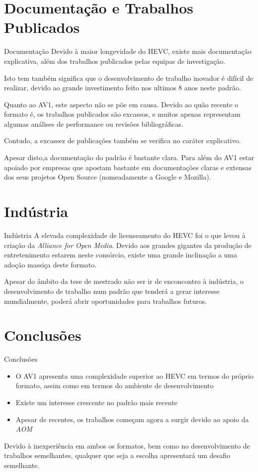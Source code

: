 \documentclass{beamer}
\begin{document}
\section{Documentação e Trabalhos Publicados}
\begin{frame}{Documentação}
	Devido à maior longevidade do HEVC, existe mais documentação explicativa, além dos trabalhos publicados pelas equipas de investigação.

	Isto tem também significa que o desenvolvimento de trabalho inovador é difícil de realizar, devido ao grande investimento feito nos ultimos 8 anos neste padrão.

	Quanto ao AV1, este aspecto não se põe em causa. Devido ao quão recente o formato é, os trabalhos publicados são excassos, e muitos apenas representam algumas análises de performance ou revisões bibliográficas.

	Contudo, a excassez de publicações também se verifica no caráter explicativo.

	Apesar disto,a documentação do padrão é bastante clara. Para além do AV1 estar apoiado por empresas que apostam bastante em documentações claras e extensas dos seus projetos Open Source (nomeadamente a Google e Mozilla).
\end{frame}

\section{Indústria}
\begin{frame}{Indústria}
	A elevada complexidade de licenseamento do HEVC foi o que levou à criação da \textit{Alliance for Open Media}. Devido aos grandes gigantes da produção de entretenimento estarem neste consórcio, existe uma grande inclinação a uma adoção massiça deste formato.

	Apesar do âmbito da tese de mestrado não ser ir de enconcontro à indústria, o desenvolvimento de trabalho num padrão que tenderá a gerar interesse mundialmente, poderá abrir oportunidades para trabalhos futuros.
\end{frame}

\section{Conclusões}
\begin{frame}{Conclusões}
	\begin{itemize}
		\item O AV1 apresenta uma complexidade superior ao HEVC em termos do próprio formato, assim como em termos do ambiente de desenvolvimento
		\item Existe um interesse crescente no padrão mais recente
		\item Apesar de recentes, os trabalhos começam agora a surgir devido ao apoio da \textit{AOM}
	\end{itemize}

	Devido à inexperiência em ambos os formatos, bem como no desenvolvimento de trabalhos semelhantes, qualquer que seja a escolha apresentará um desafio semelhante.
\end{frame}
\end{document}
